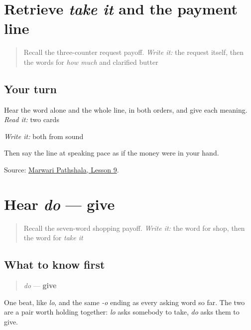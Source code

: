 \section[Practice]{Retrieve \emph{take it} and the payment line}

\label{lesson:MW-R24-pay-two}



\begin{quote}
Recall the three-counter request payoff. \emph{Write it:} the request itself, then the words for \emph{how much} and clarified butter
\end{quote}

\subsection*{Your turn}
Hear the word alone and the whole line, in both orders, and give each meaning. \emph{Read it:} two cards

\emph{Write it:} both from sound

Then say the line at speaking pace as if the money were in your hand.

\begin{tcolorbox}[breakable,colback=teal!4,colframe=teal!35!black,title={Before you move on}]
Source: \href{https://www.marwaripathshala.com/marwari-lesson-9-english}{Marwari Pathshala, Lesson 9}.
\end{tcolorbox}
\section[do]{Hear \emph{do} — give}

\label{lesson:MW-C24-hear-do}



\begin{quote}
Recall the seven-word shopping payoff. \emph{Write it:} the word for shop, then the word for \emph{take it}
\end{quote}

\subsection*{What to know first}
\begin{quote}
\emph{do} — \textbf{give}
\end{quote}

One beat, like \emph{lo}, and the same \emph{-o} ending as every asking word so far. The two are a pair worth holding together: \emph{lo} asks somebody to take, \emph{do} asks them to give.

